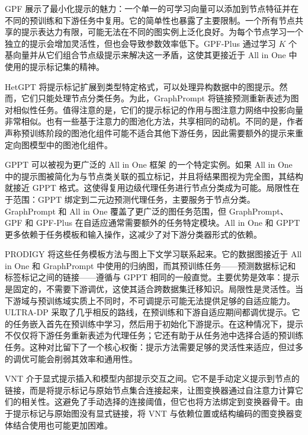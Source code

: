 GPF \cite{fang2022prompt} 展示了最小化提示的魅力：一个单一的可学习向量可以添加到节点特征并在不同的预训练和下游任务中复用。它的简单性也暴露了主要限制。一个所有节点共享的提示表达力有限，可能无法在不同的图实例上泛化良好。为每个节点学习一个独立的提示会增加灵活性，但也会导致参数效率低下。GPF-Plus \cite{fang2023universal} 通过学习 $K$ 个基向量并从它们组合节点级提示来解决这一矛盾，这使其更接近于 All in One \cite{sun2023all} 中使用的提示标记集的精神。


HetGPT \cite{ma2023hetgpt} 将提示标记扩展到类型特定格式，可以处理异构数据中的图提示。然而，它们只能处理节点分类任务。为此，GraphPrompt \cite{liu2023graphprompt} 将链接预测重新表述为图对相似性任务。值得注意的是，它们的提示标记的作用与图注意力网络中投影向量非常相似。也有一些基于注意力的图池化方法，共享相同的动机。不同的是，作者声称预训练阶段的图池化组件可能不适合其他下游任务，因此需要额外的提示来重定向图模型中的图池化组件。

GPPT \cite{sun2022gppt} 可以被视为更广泛的 All in One 框架 \cite{sun2023all} 的一个特定实例。如果 All in One 中的提示图被简化为与节点类关联的孤立标记，并且将结果图视为完全图，其结构就接近 GPPT 格式。这使得复用边级代理任务进行节点分类成为可能。局限性在于范围：GPPT 绑定到二元边预测代理任务，主要服务于节点分类。GraphPrompt 和 All in One 覆盖了更广泛的图任务范围，但 GraphPrompt、GPF 和 GPF-Plus 在自适应通常需要额外的任务特定模块。All in One 和 GPPT 更多依赖于任务模板和输入操作，这减少了对下游分类器形式的依赖。


PRODIGY \cite{huang2023prodigy} 将这些任务模板方法与图上下文学习联系起来。它的数据图接近于 All in One 和 GraphPrompt 中使用的归纳图，而其预训练任务——预测数据标记和标签标记之间的链接——遵循与 GPPT 相同的一般直觉。主要优势是效率：提示是固定的，不需要下游调优，这使其适合跨数据集迁移知识。局限性是灵活性。当下游域与预训练域实质上不同时，不可调提示可能无法提供足够的自适应能力。ULTRA-DP \cite{chen2023ultradp} 采取了几乎相反的路线，在预训练和下游自适应期间都调优提示。它的任务嵌入首先在预训练中学习，然后用于初始化下游提示。在这种情况下，提示不仅仅将下游任务重新表述为代理任务；它还有助于从任务池中选择合适的预训练任务。这种对比留下了一个核心权衡：提示方法需要足够的灵活性来适应，但过多的调优可能会削弱其效率和通用性。


VNT \cite{tan2023virtual} 介于显式提示插入和模型内部提示交互之间。它不是手动定义提示到节点的链接，而是将提示标记与原始节点集合连接起来，让图变换器通过自注意力计算它们的相关性。这避免了手动选择的连接阈值，但它也将方法绑定到变换器骨干。由于提示标记与原始图没有显式链接，将 VNT 与依赖位置或结构编码的图变换器变体结合使用也可能更加困难。

